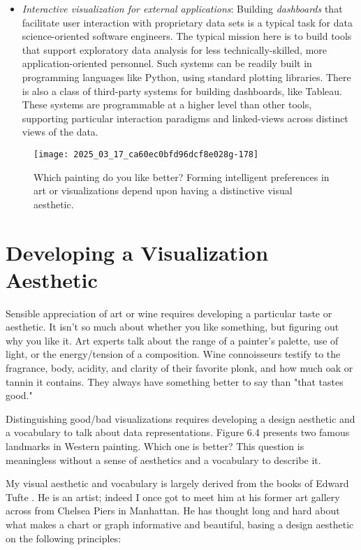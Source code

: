 \documentclass[10pt]{article}
\begin{document}
\begin{itemize}
  \item \emph{Interactive visualization for external applications}: Building \emph{dashboards} that facilitate user interaction with proprietary data sets is a typical task for data science-oriented software engineers. The typical mission here is to build tools that support exploratory data analysis for less technically-skilled, more application-oriented personnel. Such systems can be readily built in programming languages like Python, using standard plotting libraries. There is also a class of third-party systems for building dashboards, like Tableau. These systems are programmable at a higher level than other tools, supporting particular interaction paradigms and linked-views across distinct views of the data.
\end{itemize}

\begin{figure}[h]
    \centering
    \texttt{[image: 2025\_03\_17\_ca60ec0bfd96dcf8e028g-178]}
    \caption{Which painting do you like better? Forming intelligent preferences in art or visualizations depend upon having a distinctive visual aesthetic.}
\end{figure}

\section{Developing a Visualization Aesthetic}

Sensible appreciation of art or wine requires developing a particular taste or aesthetic. It isn't so much about whether you like something, but figuring out why you like it. Art experts talk about the range of a painter's palette, use of light, or the energy/tension of a composition. Wine connoisseurs testify to the fragrance, body, acidity, and clarity of their favorite plonk, and how much oak or tannin it contains. They always have something better to say than "that tastes good."

Distinguishing good/bad visualizations requires developing a design aesthetic and a vocabulary to talk about data representations. Figure 6.4 presents two famous landmarks in Western painting. Which one is better? This question is meaningless without a sense of aesthetics and a vocabulary to describe it.

My visual aesthetic and vocabulary is largely derived from the books of Edward Tufte \cite{Tuf83, Tuf90, Tuf97}. He is an artist; indeed I once got to meet him at his former art gallery across from Chelsea Piers in Manhattan. He has thought long and hard about what makes a chart or graph informative and beautiful, basing a design aesthetic on the following principles:
\end{document}
